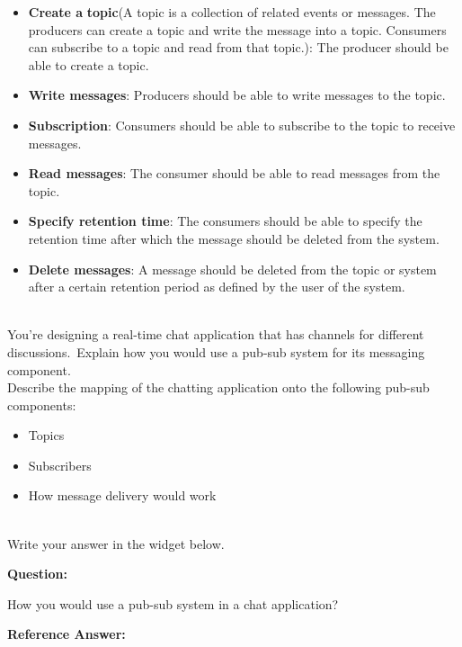 \begin{itemize}
\item
\protect{}\label{3hs5-dXbuy0biNcy6yU6T}
\textbf{Create a} \textbf{topic}(A topic is a collection of related events or messages. The producers can create a topic and write the message into a topic. Consumers can subscribe to a topic and read from that topic.): The producer should be able to create a topic.
\item
\protect{}\label{xtcZyiVnp_Sqk3JRCYWXR}
\textbf{Write messages}: Producers should be able to write messages to the topic.
\item
\protect{}\label{UL_O8yQ41sP5U0fDnSAyP}
\textbf{Subscription}: Consumers should be able to subscribe to the topic to receive messages.
\item
\protect{}\label{_6ZoJaFuJ8RYp0G3RDbWe}
\textbf{Read messages}: The consumer should be able to read messages from the topic.
\item
\protect{}\label{KlwrmVLJNLji1JyzSgOjk}
\textbf{Specify retention time}: The consumers should be able to specify the retention time after which the message should be deleted from the system.
\item
\protect{}\label{oH9UTeM0xJsiPFRucndOE}
\textbf{Delete messages}: A message should be deleted from the topic or system after a certain retention period as defined by the user of the system.
\end{itemize}
\\
You're designing a real-time chat application that has channels for different discussions.~Explain how you would use a pub-sub system for its messaging component.~
\\
Describe the mapping of the chatting application onto the following pub-sub components:

\begin{itemize}
\item
Topics
\item
Subscribers
\item
How message delivery would work\\
\end{itemize}
\\
Write your answer in the widget below.

\textbf{Question:}

How you would use a pub-sub system in a chat application?

\textbf{Reference Answer:}

